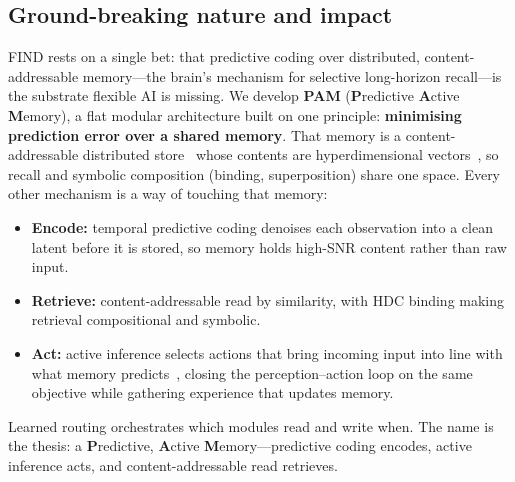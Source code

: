 \subsection{Ground-breaking nature and impact}

FIND rests on a single bet: that predictive coding over distributed, content-addressable memory---the brain's mechanism for selective long-horizon recall---is the substrate flexible AI is missing. We develop \textbf{PAM} (\textbf{P}redictive \textbf{A}ctive \textbf{M}emory), a flat modular architecture built on one principle: \textbf{minimising prediction error over a shared memory}. That memory is a content-addressable distributed store~\cite{wu2018kanerva,kanerva2003sparse} whose contents are hyperdimensional vectors~\cite{kanerva2009hyperdimensional}, so recall and symbolic composition (binding, superposition) share one space. Every other mechanism is a way of touching that memory:
\begin{itemize}[noitemsep,topsep=2pt]
  \item \textbf{Encode:} temporal predictive coding denoises each observation into a clean latent before it is stored, so memory holds high-SNR content rather than raw input.
  \item \textbf{Retrieve:} content-addressable read by similarity, with HDC binding making retrieval compositional and symbolic.
  \item \textbf{Act:} active inference selects actions that bring incoming input into line with what memory predicts~\cite{friston2010free,rao2023active}, closing the perception--action loop on the same objective while gathering experience that updates memory.
\end{itemize}
\noindent Learned routing orchestrates which modules read and write when. The name is the thesis: a \textbf{P}redictive, \textbf{A}ctive \textbf{M}emory---predictive coding encodes, active inference acts, and content-addressable read retrieves.


